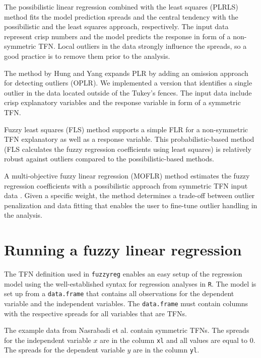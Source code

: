 \documentclass[a4paper]{article}
\begin{document}
The possibilistic linear regression combined with the least squares (PLRLS) method
\cite{ref:LeeTanaka1999} fits the model prediction spreads and the central tendency with the
possibilistic and the least squares approach, respectively. The input data represent crisp numbers and
the model predicts the response in form of a non-symmetric TFN. Local outliers in the data strongly
influence the spreads, so a good practice is to remove them prior to the analysis.

The method by Hung and Yang \cite{ref:Hung2006} expands PLR \cite{ref:Tanaka1989} by adding an omission
approach for detecting outliers (OPLR). We implemented a version that identifies a single outlier in the
data located outside of the Tukey's fences. The input data include crisp explanatory variables and the
response variable in form of a symmetric TFN.

Fuzzy least squares (FLS) method \cite{ref:Diamond1988} supports a simple FLR for a non-symmetric TFN
explanatory as well as a response variable. This probabilistic-based method (FLS calculates the fuzzy
regression coefficients using least squares) is relatively robust against outliers compared to the
possibilistic-based methods.

A multi-objective fuzzy linear regression (MOFLR) method estimates the fuzzy regression coefficients with
a possibilistic approach from symmetric TFN input data \cite{ref:Nasrabadi2005}. Given a specific weight,
the method determines a trade-off between outlier penalization and data fitting that enables the user to
fine-tune outlier handling in the analysis.


\section{Running a fuzzy linear regression}

The TFN definition used in \texttt{fuzzyreg} enables an easy setup of the regression model
using the well-established syntax for regression analyses in \texttt{R}. The model is set up
from a \texttt{data.frame} that contains all observations for the dependent variable and
the independent variables. The \texttt{data.frame} must contain columns with the
respective spreads for all variables that are TFNs.

The example data from Nasrabadi et al. \cite{ref:Nasrabadi2005} contain symmetric TFNs.
The spreads for the independent
variable $x$ are in the column \texttt{xl} and all values are equal to 0. The spreads for the
dependent variable $y$ are in the column \texttt{yl}.
\end{document}
